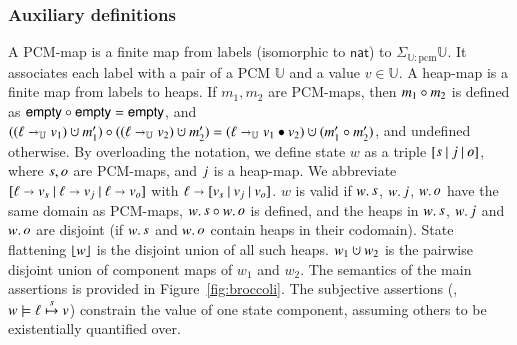\subsubsection{Auxiliary definitions} A PCM-map is a finite map from
labels (isomorphic to $\mathsf{nat}$) to $\Sigma_{{\mathbb
    U}{:}\textrm{pcm}} \mathbb U$. It associates each label with a
pair of a PCM $\mathbb U$ and a value $v \in \mathbb U$. A heap-map is
a finite map from labels to heaps.
%
If $m_1, m_2$ are PCM-maps, then $m_1 \circ m_2$ is defined as
$\mathsf{empty} \circ \mathsf{empty} = \mathsf{empty}$, and $((\hlabel
\hpts_{\mathbb U} v_1) \hunion m'_1) \zip ((\hlabel \hpts_{\mathbb U} v_2)
\hunion m'_2) = (\hlabel \hpts_{\mathbb U} v_1 \join v_2) \hunion (m'_1 \zip
m'_2)$, and undefined otherwise.
% 
By overloading the notation, we define state $w$ as a triple
$[{\mathop{s}}~|~{\mathop{j}}~|~{\mathop{o}}]$, where $\mathop{s},
\mathop{o}$ are PCM-maps, and $\mathop{j}$ is a heap-map. We
abbreviate $[{{\ell \shortrightarrow v_s}}~|~{{\ell \shortrightarrow v_j}}~|~{{\ell
    \shortrightarrow v_o}}]$ with $\ell \shortrightarrow [{{v_s}}~|~{{v_j}}~|~{{v_o}}]$.
%
$w$ is valid if $w.\mathop{s}$, $w.\mathop{j}$, $w.\mathop{o}$ have the
same domain as PCM-maps, ${w.\mathop{s}} \circ {w.\mathop{o}}$ is
defined, and the heaps in $w.\mathop{s}$, $w.\mathop{j}$ and
$w.\mathop{o}$ are disjoint (if $w.\mathop{s}$ and $w.\mathop{o}$
contain heaps in their codomain). State flattening ${\lfloor w \rfloor}$ is
the disjoint union of all such heaps. $w_1 \hunion w_2$ is the
pairwise disjoint union of component maps of $w_1$ and $w_2$. The
semantics of the main \SCST assertions is provided in
Figure~\ref{fig:broccoli}. The subjective assertions (\eg, $w \models
\ell \mathrel{\overset{s}{\mapsto}} v$) constrain the value of one state component, assuming
others to be existentially quantified over.

